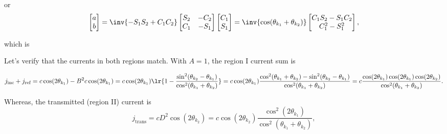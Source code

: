 \begin{enumerate}[(i)]
or
\begin{dmath}\label{eqn:gradQuantumProblemSet4Problem3:820}
\begin{bmatrix}
a \\
b
\end{bmatrix}
=
\inv{- S_1 S_2 + C_1 C_2 }
\begin{bmatrix}
S_2 & -C_2 \\
C_1 & -S_1
\end{bmatrix}
\begin{bmatrix}
C_1 \\
S_1
\end{bmatrix}
=
\inv{\cos(\theta_{k_1} + \theta_{k_2})}
\begin{bmatrix}
C_1 S_2 - S_1 C_2 \\
C_1^2 - S_1^2
\end{bmatrix},
\end{dmath}

which is

Let's verify that the currents in both regions match.  With \( A = 1 \), the region I current sum is

\begin{dmath}\label{eqn:gradQuantumProblemSet4Problem3:1000}
j_{\textrm{inc}} 
+ j_{\textrm{ref}} 
=
c \cos( 2 \theta_{k_1} ) - B^2 c \cos( 2 \theta_{k_1} )
=
c \cos( 2 \theta_{k_1} ) 
\lr{ 1 - 
\frac{ \sin^2(\theta_{k_2} - \theta_{k_1}) }{\cos^2(\theta_{k_1} + \theta_{k_2})} }
=
c \cos( 2 \theta_{k_1} ) 
\frac{ \cos^2(\theta_{k_1} + \theta_{k_2}) - \sin^2(\theta_{k_2} - \theta_{k_1}) }{\cos^2(\theta_{k_1} + \theta_{k_2})} 
=
c 
\frac{ \cos( 2 \theta_{k_1} ) \cos(2 \theta_{k_1}) \cos(2 \theta_{k_2})}
{\cos^2(\theta_{k_1} + \theta_{k_2})}.
\end{dmath}

Whereas, the transmitted (region II) current is
\begin{dmath}\label{eqn:gradQuantumProblemSet4Problem3:1020}
j_{\textrm{trans}} 
=
 c D^2 \cos( 2 \theta_{k_2} )
=
 c \cos( 2 \theta_{k_2} )
\frac{ \cos^2(2 \theta_{k_1}) }{\cos^2(\theta_{k_1} + \theta_{k_2})},
\end{dmath}


\end{enumerate}

